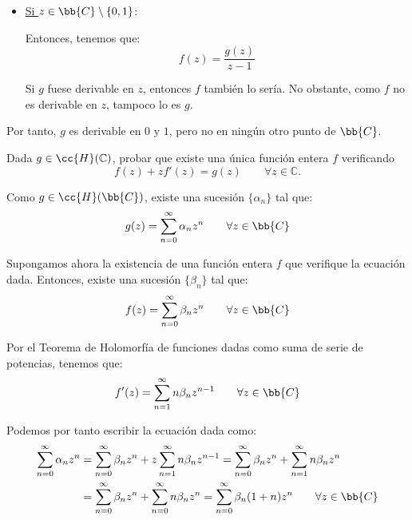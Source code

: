 \documentclass[12pt]{article}
\begin{document}
\begin{ejercicio}[3 puntos]
\begin{itemize}
            \item \ul{Si $z\in\bb{C}\setminus\{0,1\}$}:
            
            Entonces, tenemos que:
            \begin{equation*}
                f(z) = \dfrac{g(z)}{z-1}
            \end{equation*}

            Si $g$ fuese derivable en $z$, entonces $f$ también lo sería. No obstante, como $f$ no es derivable en $z$, tampoco lo es $g$.
        \end{itemize}

        Por tanto, $g$ es derivable en $0$ y $1$, pero no en ningún otro punto de $\bb{C}$.
    \end{ejercicio}

    \begin{ejercicio}[3.5 puntos]
        Dada $g \in \cc{H} (\mathbb{C})$, probar que existe una única función entera $f$ verificando
        \begin{equation*}
            f(z) + z f'(z) = g(z) \qquad \forall z \in \mathbb{C}.
        \end{equation*}

        Como $g\in \cc{H}(\bb{C})$, existe una sucesión $\{\alpha_n\}$ tal que:
        \begin{equation*}
            g(z) = \sum_{n=0}^{\infty} \alpha_n z^n \qquad \forall z\in\bb{C}
        \end{equation*}

        Supongamos ahora la existencia de una función entera $f$ que verifique la ecuación dada. Entonces, existe una sucesión $\{\beta_n\}$ tal que:
        \begin{equation*}
            f(z) = \sum_{n=0}^{\infty} \beta_n z^n \qquad \forall z\in\bb{C}
        \end{equation*}

        Por el Teorema de Holomorfía de funciones dadas como suma de serie de potencias, tenemos que:
        \begin{equation*}
            f'(z) = \sum_{n=1}^{\infty} n \beta_n z^{n-1} \qquad \forall z\in\bb{C}
        \end{equation*}

        Podemos por tanto escribir la ecuación dada como:
        \begin{align*}
            \sum_{n=0}^{\infty} \alpha_n z^n &= \sum_{n=0}^{\infty} \beta_n z^n + z \sum_{n=1}^{\infty} n \beta_n z^{n-1} = \sum_{n=0}^{\infty} \beta_n z^n + \sum_{n=1}^{\infty} n \beta_n z^n\\
            &= \sum_{n=0}^{\infty} \beta_n z^n + \sum_{n=0}^{\infty} n \beta_n z^n = \sum_{n=0}^{\infty} \beta_n(1+n)z^n\qquad \forall z\in\bb{C}
        \end{align*}


\end{ejercicio}
\end{document}
